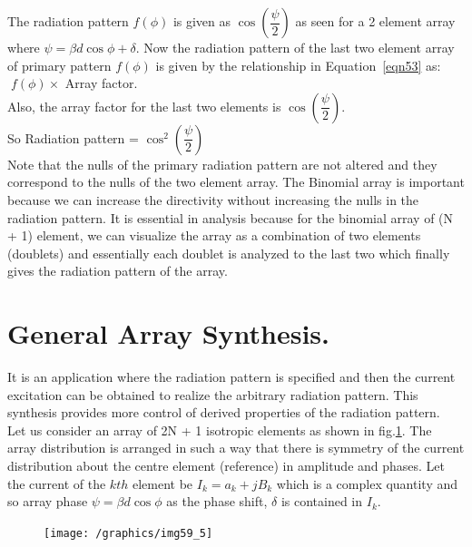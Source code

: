 The radiation pattern $f(\phi)$ is given as $\cos(\dfrac{\psi}{2})$ as seen for a 2 element array where $\psi = \beta d\cos\phi + \delta$. Now the radiation pattern of the last two element array of primary pattern $f(\phi)$ is given by the relationship in Equation~\ref{eqn53} as:   $\; f(\phi) \times$ Array factor. \\
Also, the array factor for the last two elements is $\cos(\dfrac{\psi}{2})$.\\
So Radiation pattern = $\cos^2(\dfrac{\psi}{2})$\\
Note that the nulls of the primary radiation pattern are not altered and they correspond to the nulls of the two element array. The Binomial array is important because we can increase the directivity without increasing the nulls in the radiation pattern. It is essential in analysis because for the binomial array of (N + 1) element, we can visualize the array as a combination of two elements (doublets) and essentially each doublet is analyzed to the last two which finally gives the radiation pattern of the array.

\section{General Array Synthesis.}
It is an application where the radiation pattern is specified and then the current excitation can be obtained to realize the arbitrary radiation pattern. This synthesis provides more control of derived properties of the radiation pattern.\\
Let us consider an array of 2N + 1 isotropic elements as shown in fig.\ref{fig:fig-4}. The array distribution is arranged in such a way that there is symmetry of the current distribution about the centre element (reference) in amplitude and phases. Let the current of the $kth$ element be $I_k =a_k + jB_k$ which is a complex quantity and so array phase $\psi =\beta d\cos\phi$ as the phase shift, $\delta$ is contained in $I_k$.
\begin{figure}[h]
\centering
\texttt{[image: /graphics/img59\_5]}
\caption{}
\label{fig:fig-4}
\end{figure}

